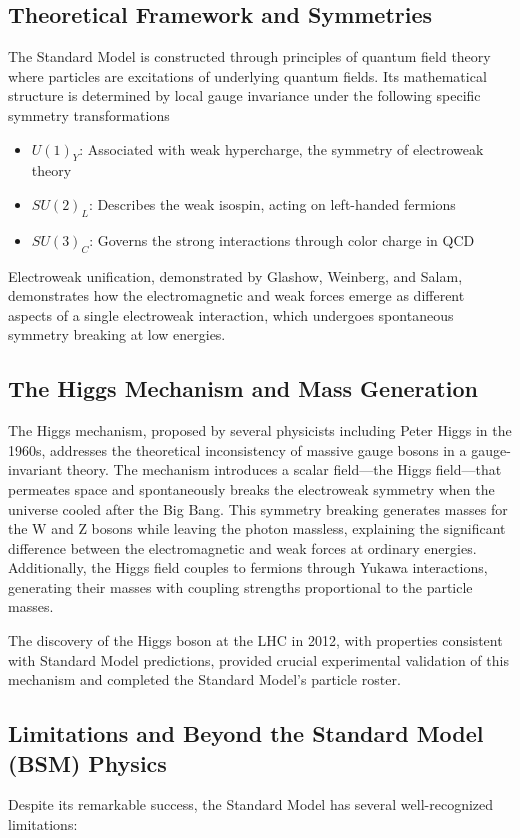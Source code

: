 \subsection{Theoretical Framework and Symmetries}
The Standard Model is constructed through principles of quantum field theory where particles are excitations of underlying quantum fields.
%
Its mathematical structure is determined by local gauge invariance under the following specific symmetry transformations
\begin{itemize}
    \item $U(1)_Y$: Associated with weak hypercharge, the symmetry of electroweak theory
    \item $SU(2)_L$: Describes the weak isospin, acting on left-handed fermions
    \item $SU(3)_C$: Governs the strong interactions through color charge in QCD
\end{itemize}

Electroweak unification, demonstrated by Glashow, Weinberg, and Salam, demonstrates how the electromagnetic and weak forces emerge as different aspects of a single electroweak interaction, which undergoes spontaneous symmetry breaking at low energies.

\subsection{The Higgs Mechanism and Mass Generation}
The Higgs mechanism, proposed by several physicists including Peter Higgs in the 1960s, addresses the theoretical inconsistency of massive gauge bosons in a gauge-invariant theory.
%
The mechanism introduces a scalar field---the Higgs field---that permeates space and spontaneously breaks the electroweak symmetry when the universe cooled after the Big Bang.
%
This symmetry breaking generates masses for the W and Z bosons while leaving the photon massless, explaining the significant difference between the electromagnetic and weak forces at ordinary energies. Additionally, the Higgs field couples to fermions through Yukawa interactions, generating their masses with coupling strengths proportional to the particle masses.

The discovery of the Higgs boson at the LHC in 2012, with properties consistent with Standard Model predictions, provided crucial experimental validation of this mechanism and completed the Standard Model's particle roster.

\subsection{Limitations and Beyond the Standard Model (BSM) Physics}
Despite its remarkable success, the Standard Model has several well-recognized limitations:

